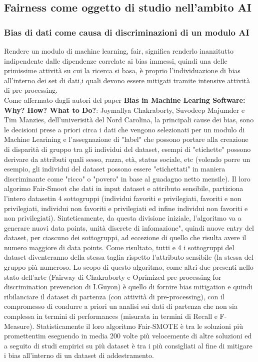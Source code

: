 \subsection{Fairness come oggetto di studio nell'ambito AI}
\subsubsection{Bias di dati come causa di discriminazioni di un modulo AI}

Rendere un modulo di machine learning, fair, significa renderlo inanzitutto indipendente dalle dipendenze correlate ai bias immessi, quindi una delle primissime attività su cui la ricerca si basa, è proprio l'individuazione di bias all'interno dei set di dati,i quali devono essere mitigati tramite intensive attività di pre-processing.\\  

\cite{biasInML} Come affermato dagli autori del paper \textbf{Bias in Machine Learing Software: Why? How? What to Do?}: Joymallya Chakraborty, Suvodeep Majumder e Tim Manzies, dell'univerisità del Nord Carolina, la principali cause dei bias, sono le decisioni prese a priori circa i dati che vengono selezionati per un modulo di Machine Learining e l'assegnazione di "label" che possono portare alla creazione di disparità di gruppo tra gli individui del dataset, esempi di "etichette" possono derivare da attributi quali sesso, razza, età, status sociale, etc (volendo porre un esempio, gli individui del dataset possono essere "etichettati" in maniera discriminante come "ricco" o "povero" in base al guadagno netto mensile). Il loro algorimo Fair-Smoot che dati in input dataset e attributo sensibile, partiziona l'intero datasetin 4 sottogruppi (individui favoriti e privilegiati, favoriti e non privilegiati, individui non favoriti e privilegiati ed infine individui non favoriti e non privilegiati). Sinteticamente, da questa divisione iniziale, l'algoritmo va a generare nuovi data points, unità discrete di infomazione", quindi nuove entry del dataset, per ciascuno dei sottogruppi, ad eccezione di quello che risulta avere il numero maggiore di data points. Come risultato, tutti e 4 i sottogruppi del dataset diventeranno della stessa taglia rispetto l'attributo sensibile (la stessa del gruppo più numeroso. Lo scopo di questo algoritmo, come altri due presenti nello stato dell'arte (Fairway di Chakraborty e Oprimized pre-processing for discrimination prevencion di I.Guyon) è quello di fornire bias mitigation e quindi ribilanciare il dataset di partenza (con attività di pre-processing), con il compromesso di condurre a priori un analisi sui dati di partenza che non sia complessa in termini di performances (misurata in termini di Recall e F-Measure). Statisticamente il loro algoritmo Fair-SMOTE è tra le soluzioni più promettentim eseguendo in media 200 volte più velocemente di altre soluzioni ed a seguito di studi empirici su più dataset è tra i più consigliati al fine di mitigare i bias all'interno di un dataset di addestramento.

